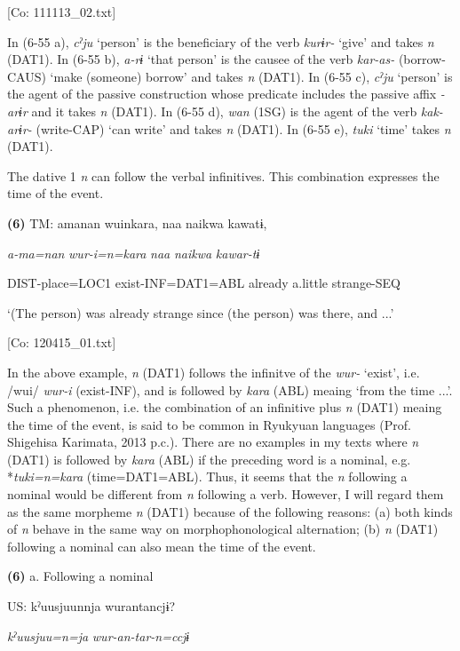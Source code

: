       [Co: 111113\_02.txt]

In (6-55 a), \textit{cˀju} ‘person’ is the beneficiary of the verb \textit{kurɨr-} ‘give’ and takes \textit{n} (DAT1). In (6-55 b), \textit{a-rɨ} ‘that person’ is the causee of the verb \textit{kar-as-} (borrow-CAUS) ‘make (someone) borrow’ and takes \textit{n} (DAT1). In (6-55 c), \textit{cˀju} ‘person’ is the agent of the passive construction whose predicate includes the passive affix \textit{{}-arɨr} and it takes \textit{n} (DAT1). In (6-55 d), \textit{wan} (1SG) is the agent of the verb \textit{kak-arɨr-} (write-CAP) ‘can write’ and takes \textit{n} (DAT1). In (6-55 e), \textit{tuki} ‘time’ takes \textit{n} (DAT1).

  The dative 1 \textit{n} can follow the verbal infinitives. This combination expresses the time of the event.

\textbf{(6)}  TM:  amanan  wuinkara,  naa  naikwa  kawatɨ,

    \textit{a-ma=nan}  \textit{wur-i=n=kara}  \textit{naa}  \textit{naikwa}  \textit{kawar-tɨ}

    DIST-place=LOC1  exist-INF=DAT1=ABL  already  a.little  strange-SEQ

    ‘(The person) was already strange since (the person) was there, and ...’

    [Co: 120415\_01.txt]

In the above example, \textit{n} (DAT1) follows the infinitve of the \textit{wur-} ‘exist’, i.e. /wui/ \textit{wur-i} (exist-INF), and is followed by \textit{kara} (ABL) meaing ‘from the time ...’. Such a phenomenon, i.e. the combination of an infinitive plus \textit{n} (DAT1) meaing the time of the event, is said to be common in Ryukyuan languages (Prof. Shigehisa Karimata, 2013 p.c.). There are no examples in my texts where \textit{n} (DAT1) is followed by \textit{kara} (ABL) if the preceding word is a nominal, e.g. *\textit{tuki=n=kara} (time=DAT1=ABL). Thus, it seems that the \textit{n} following a nominal would be different from \textit{n} following a verb. However, I will regard them as the same morpheme \textit{n} (DAT1) because of the following reasons: (a) both kinds of \textit{n} behave in the same way on morphophonological alternation; (b) \textit{n} (DAT1) following a nominal can also mean the time of the event.

\textbf{(6)}  a.  Following a nominal

    US:  kˀuusjuunnja  wurantancjɨ?

      \textit{kˀuusjuu=n=ja}  \textit{wur-an-tar-n=ccjɨ}

